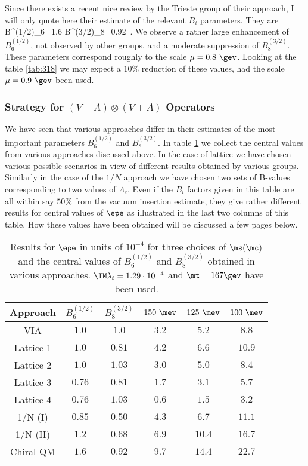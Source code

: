 Since there exists a recent nice review \cite{BERT98} by the Trieste 
group of their
approach, I will only quote here their estimate of the relevant 
$B_i$ parameters. They are
\be\label{TRIESTE}
B^{(1/2)}_{6}=1.6 \quad\quad B^{(3/2)}_{8}=0.92~.
\quad{}
\ee
We observe a rather large enhancement of $B^{(1/2)}_{6}$, not observed
by other groups, and a
moderate suppression of $B^{(3/2)}_{8}$. These parameters correspond
roughly to the scale $\mu=0.8~\gev$. Looking at the table
\ref{tab:318} we may expect a $10\%$ reduction of these values,
had the scale $\mu=0.9~\gev$ been used.

\subsubsection{Strategy for $(V-A) \otimes (V+A)$ Operators}
We have seen that various approaches differ in their estimates
of the most important parameters $B^{(1/2)}_{6}$ and $B^{(3/2)}_{8}$.
In table \ref{tab:31739} we collect the central values from various
approaches discussed above. In the case of lattice we have chosen
various possible scenarios in view of different results obtained
by various groups. Similarly in the case of the $1/N$ approach
we have chosen two sets of B-values corresponding to two values
of $\Lambda_c$. 
Even if
the $B_i$ factors given in this table are all within say $50\%$ from the
vacuum insertion estimate, they give rather different results
for central values of $\epe$ as illustrated in the last two columns
of this table. How these values have been obtained will be discussed 
a few pages below.
\begin{table}[thb]
\caption[]{ Results for $\epe$ in units of $10^{-4}$ 
for three choices of $\ms(\mc)$
and the central values of  $B^{(1/2)}_6$ and $B^{(3/2)}_8$ 
obtained in various approaches. $\IM\lambda_t=1.29\cdot 10^{-4}$
and $\mt=167\gev$ have been used.
\label{tab:31739}}
\begin{center}
\begin{tabular}{|c|c|c||c|c|c|}\hline
  Approach & $B^{(1/2)}_6$& $B^{(3/2)}_8$ & $150~\mev$& 
 $125~\mev$ & $100~\mev$ \\ \hline
  VIA    & $1.0$ &$1.0$ & $3.2$ & $5.2$ & $8.8$ \\
\hline
Lattice 1    & $1.0$ &$0.81$ & $4.2$ & $6.6$ & $10.9$  \\
Lattice 2    & $1.0$ &$1.03$ & $3.0$ & $5.0$ & $8.4$ \\
Lattice 3    & $0.76$ &$0.81$ & $1.7$ & $3.1$ & $5.7$ \\
Lattice 4    & $0.76$ &$1.03$ & $0.6$ & $1.5$ & $3.2$  \\
\hline
1/N (I) & $0.85$ &$0.50$ & $4.3$ & $6.7$ & $11.1$  \\
1/N (II) & $1.2$ &$0.68$ & $6.9$ & $10.4$ &$ 16.7$\\
\hline
Chiral QM & $1.6$ &$0.92$ & $9.7$ & $14.4$ & $22.7$  \\
\hline
\end{tabular}
\end{center}
\end{table}

